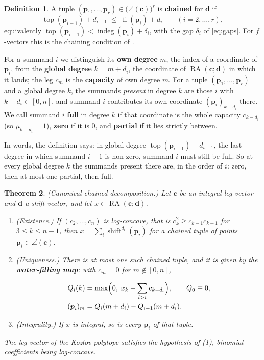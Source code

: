 \documentclass[11pt, a4paper, abstract=yes]{scrartcl}
\theoremstyle{definition}
\newtheorem{definition}{Definition}
\theoremstyle{remark}
\theoremstyle{plain}
\newtheorem{theorem}[definition]{Theorem}
\newcommand{\vek}[1]{\boldsymbol{#1}}
\theoremstyle{remark}
\theoremstyle{plain}
\newcommand{\shift}{\operatorname{shift}}
\newcommand{\indeg}{\operatorname{indeg}}
\newcommand{\tp}{\operatorname{top}}
\newcommand{\rasimp}{\angle}
\newcommand{\RA}{\operatorname{RA}}
\newcommand{\fl}{\operatorname{fl}}
\newcommand{\leandiscof}[1]{\tikz[baseline=-0.6ex]\fill[#1] (0,0) circle (0.6ex);}
\newcommand{\leanfull}{\leandiscof{leanfull}}
\newcommand{\leanmark}[1]{\leavevmode{\reversemarginpar\marginnote{\raggedleft#1}}}
\let\autocite\cite
\begin{document}
\begin{definition}
A tuple \((\vek p_1,\dots,\vek p_r)\in\bigl(\rasimp(\vek c)\bigr)^r\) is \textbf{chained} for
\(\vek d\) if
\begin{equation}\label{eq:chained}
  \tp(\vek p_{i-1})+d_{i-1}\;\le\;\fl(\vek p_i)+d_i\qquad(i=2,\dots,r),
\end{equation}
equivalently \(\tp(\vek p_{i-1})<\indeg(\vek p_i)+\delta_i\), with the gap \(\delta_i\) of
\eqref{eq:gaps}. For
\(f\)-vectors this is the chaining condition of \autocite[Definition 19]{SnellmanArticle2}.
\label{def-chained-points}
\end{definition}

For a summand \(i\) we distinguish its \textbf{own degree} \(m\), the index of a coordinate of
\(\vek p_i\), from the \textbf{global degree} \(k=m+d_i\), the coordinate of \(\RA(\vek c;\vek d)\) in which
it lands; the leg \(c_m\) is the \textbf{capacity} of own degree \(m\).
For a tuple \((\vek p_1,\dots,\vek p_r)\) and a global degree \(k\), the summands \emph{present} in
degree \(k\) are those \(i\) with \(k-d_i\in[0,n]\), and summand \(i\) contributes its own coordinate
\((\vek p_i)_{k-d_i}\) there. We call summand \(i\) \textbf{full} in degree \(k\) if that coordinate is the
whole capacity \(c_{k-d_i}\) (so \(\mu_{k-d_i}=1\)), \textbf{zero} if it is \(0\), and \textbf{partial} if it lies
strictly between.

In words, the definition says: in global degree \(\tp(\vek p_{i-1})+d_{i-1}\), the last degree in
which summand \(i-1\) is non-zero, summand \(i\) must still be full. So at every global degree \(k\)
the summands present there are, in the order of \(i\): zero, then at most one partial, then full.

\begin{theorem}
\leanmark{\leanfull}(\emph{Canonical chained decomposition.}) Let \(\vek c\) be an integral leg vector and \(\vek d\) a
shift vector, and let \(x\in\RA(\vek c;\vek d)\).
\begin{enumerate}
\item (\emph{Existence.}) If \((c_2,\dots,c_n)\) is log-concave, that is \(c_k^2\ge c_{k-1}c_{k+1}\) for
\(3\le k\le n-1\), then \(x=\sum_i\shift^{d_i}(\vek p_i)\) for a chained tuple of points
\(\vek p_i\in\rasimp(\vek c)\).
\item (\emph{Uniqueness.}) There is at most one such chained tuple, and it is given by the
\textbf{water-filling map}: with \(c_m=0\) for \(m\notin[0,n]\),

\begin{equation}\label{eq:water}
\begin{aligned}
  Q_i(k)&=\max\Bigl(0,\;x_k-\sum_{l>i}c_{k-d_l}\Bigr),\qquad Q_0\equiv0,\\
  (\vek p_i)_m&=Q_i(m+d_i)-Q_{i-1}(m+d_i).
\end{aligned}
\end{equation}
\item (\emph{Integrality.}) If \(x\) is integral, so is every \(\vek p_i\) of that tuple.
\end{enumerate}
The leg vector of the Kozlov polytope satisfies the hypothesis of (1), binomial coefficients being
log-concave.
\label{thm-chained}
\end{theorem}
\end{document}
